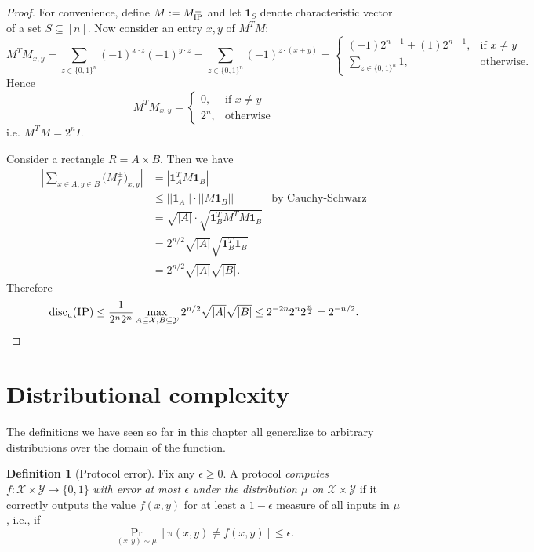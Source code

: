 \documentclass[11pt]{amsart}
\theoremstyle{plain}
\theoremstyle{definition}
\newtheorem{definition}{Definition}
\theoremstyle{plain}
\newcommand{\calX}{\mathcal{X}}
\newcommand{\calY}{\mathcal{Y}}
\newcommand{\discu}{\mathrm{disc_u}}
\newcommand{\IP}{\textsc{IP}}
\begin{document}
\begin{proof}
For convenience, define $M:= M^{\pm}_\IP$ and let $\mathbf{1}_S$ denote characteristic vector of a set $S\subseteq [n]$. Now consider an entry $x,y$ of $M^TM$:
$$M^TM_{x,y} = \sum_{z\in\{0,1\}^n} (-1)^{x\cdot z}(-1)^{y\cdot z} = \sum_{z \in \{0,1\}^n}(-1)^{z\cdot(x+y)} = \begin{cases}
(-1)2^{n-1} + (1)2^{n-1}, &\text{if $x\neq y$} \\
\sum_{z \in \{0,1\}^n}1, &\text{otherwise}.
\end{cases}$$
Hence $$M^TM_{x,y} = \begin{cases}
0, &\text{if $x\neq y$} \\
2^n, &\text{otherwise}
\end{cases}$$
i.e. $M^TM = 2^nI$.

Consider a rectangle $R = A\times B$. Then we have
\begin{align*}
\left| \sum_{x \in A, y \in B} \big(M^{\pm}_f\big)_{x,y} \right|  &= \left| \mathbf{1}_A^T M \mathbf{1}_B\right | \\
&\leq ||\mathbf{1}_A|| \cdot || M\mathbf{1}_B|| &\text{by Cauchy-Schwarz} \\
&= \sqrt{|A|}\cdot\sqrt{\mathbf{1}^T_BM^TM\mathbf{1}_B} \\
&= 2^{n/2}\sqrt{|A|}\sqrt{\mathbf{1}^T_B\mathbf{1}_B} \\
&=2^{n/2}\sqrt{|A|}\sqrt{|B|}.
\end{align*}
Therefore
$$\discu(\IP) \leq \frac{1}{2^n2^n}\max_{A \subseteq \calX, B \subseteq \calY} 2^{n/2}\sqrt{|A|}\sqrt{|B|} \leq 2^{-2n}2^n2^\frac{n}{2} = 2^{-n/2}.$$
\end{proof}


\newpage \section{Distributional complexity}

The definitions we have seen so far in this chapter all generalize to arbitrary distributions over the domain of the function.

\begin{definition}[Protocol error]
Fix any $\epsilon \ge 0$. A protocol \emph{computes} $f : \calX \times \calY \to \{0,1\}$ \emph{with error at most $\epsilon$ under the distribution $\mu$ on $\calX \times \calY$} if it correctly outputs the value $f(x,y)$ for at least a $1-\epsilon$ measure of all inputs in $\mu$, i.e., if
\[
\Pr_{(x,y) \sim \mu}[ \pi(x,y) \neq f(x,y) ] \le \epsilon.
\]
\end{definition}
\end{document}

